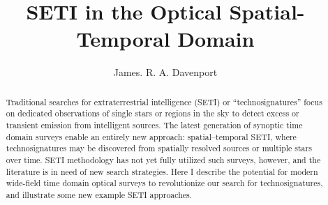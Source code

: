 \documentclass[modern]{aastex62}
\begin{document}
\title{SETI in the Optical Spatial-Temporal Domain}



\author{James. R. A. Davenport}


\begin{abstract}
Traditional searches for extraterrestrial intelligence (SETI) or ``technosignatures'' focus on dedicated observations of single stars or regions in the sky to detect excess or transient emission from intelligent sources. The latest generation of synoptic time domain surveys  enable an entirely new approach: spatial--temporal SETI, where technosignatures may be discovered from spatially resolved sources or multiple stars over time. SETI methodology has not yet fully utilized such surveys, however, and the literature is in need of new search strategies.
Here I describe the potential for modern wide-field time domain optical surveys to revolutionize our search for technosignatures, and illustrate some new example SETI approaches.
\end{abstract}



\end{document}
